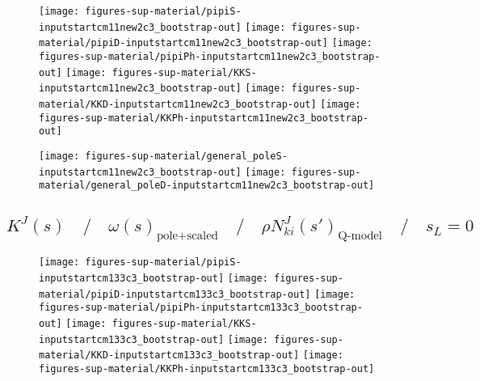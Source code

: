



\begin{figure}[h]
\centering\texttt{[image: figures-sup-material/pipiS-inputstartcm11new2c3\_bootstrap-out]} \texttt{[image: figures-sup-material/pipiD-inputstartcm11new2c3\_bootstrap-out]} \texttt{[image: figures-sup-material/pipiPh-inputstartcm11new2c3\_bootstrap-out]}
\texttt{[image: figures-sup-material/KKS-inputstartcm11new2c3\_bootstrap-out]} \texttt{[image: figures-sup-material/KKD-inputstartcm11new2c3\_bootstrap-out]} \texttt{[image: figures-sup-material/KKPh-inputstartcm11new2c3\_bootstrap-out]}
\end{figure}

\begin{figure}[h]
\centering\texttt{[image: figures-sup-material/general\_poleS-inputstartcm11new2c3\_bootstrap-out]} \texttt{[image: figures-sup-material/general\_poleD-inputstartcm11new2c3\_bootstrap-out]}
\end{figure}



\clearpage

\subsection{$K^J(s) \quad\Big/\quad \omega(s)_\text{pole+scaled} \quad\Big/\quad \rho N^J_{ki}(s')_\text{Q-model} \quad\Big/\quad s_L = 0$}
\label{subsec:inputstartcm133c3_bootstrap-out}






\begin{figure}[h]
\centering\texttt{[image: figures-sup-material/pipiS-inputstartcm133c3\_bootstrap-out]} \texttt{[image: figures-sup-material/pipiD-inputstartcm133c3\_bootstrap-out]} \texttt{[image: figures-sup-material/pipiPh-inputstartcm133c3\_bootstrap-out]}
\texttt{[image: figures-sup-material/KKS-inputstartcm133c3\_bootstrap-out]} \texttt{[image: figures-sup-material/KKD-inputstartcm133c3\_bootstrap-out]} \texttt{[image: figures-sup-material/KKPh-inputstartcm133c3\_bootstrap-out]}
\end{figure}

